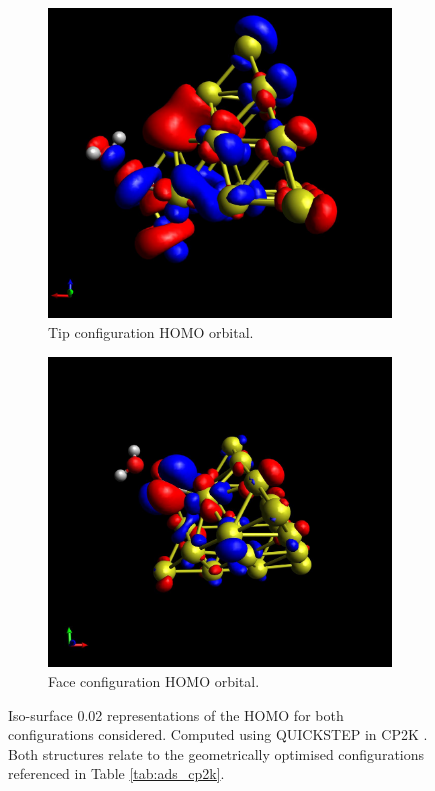 \begin{figure}
\centering
\begin{subfigure}[b]{0.425\textwidth}
    \includegraphics[width=\textwidth]{figures/ThTip_NVE-WFN_00123_1-1_200.jpg}
    \caption{Tip configuration HOMO orbital.}
    \label{fig:tip_wfn}
\end{subfigure}
\begin{subfigure}[b]{0.425\textwidth}
    \includegraphics[width=\textwidth]{figures/ThFace_GO-WFN_00123_1-1_202.jpg}
    \caption{Face configuration HOMO orbital.}
    \label{fig:face_wfn}
\end{subfigure}
    \caption{Iso-surface 0.02 representations of the HOMO for both configurations considered. Computed using QUICKSTEP \cite{QuickStep} in CP2K \cite{cp2k_2020}. Both structures relate to the geometrically optimised configurations referenced in Table \ref{tab:ads_cp2k}.}
    \label{fig:Water_Wfns}
\end{figure}

